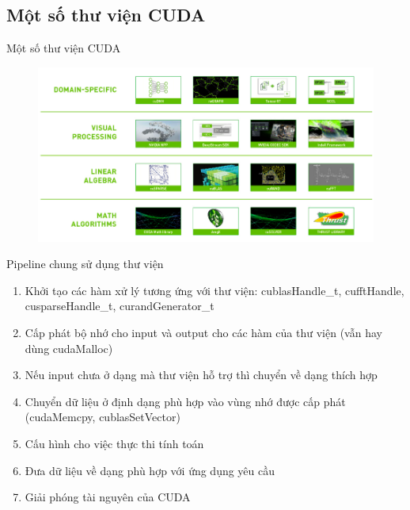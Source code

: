 \documentclass[10pt]{beamer}
\theoremstyle{remark}
\numberwithin{algocf}{section}
\numberwithin{equation}{section}
\numberwithin{dl}{section}
\numberwithin{figure}{section}
\begin{document}
\subsection{Một số thư viện CUDA}

\begin{frame}{Một số thư viện CUDA}
    \begin{figure}[H]
        \centering
        \includegraphics[width=0.8\linewidth]{figures/CUDA/CUDA_library.png}
    \end{figure}
\end{frame}

\begin{frame}{Pipeline chung sử dụng thư viện}
    \begin{enumerate}
        \item Khởi tạo các hàm xử lý tương ứng với thư viện:  cublasHandle\_t, cufftHandle,	
        cusparseHandle\_t, curandGenerator\_t
        \item Cấp phát bộ nhớ cho input và output cho các hàm của thư viện (vẫn hay dùng cudaMalloc)
        \item Nếu input chưa ở dạng mà thư viện hỗ trợ thì chuyển về dạng thích hợp
        \item Chuyển dữ liệu ở định dạng phù hợp vào vùng nhớ được cấp phát (cudaMemcpy, cublasSetVector)
        \item Cấu hình cho việc thực thi tính toán
        \item Đưa dữ liệu về dạng phù hợp với ứng dụng yêu cầu
        \item Giải phóng tài nguyên của CUDA
    \end{enumerate}
\end{frame}
\end{document}
